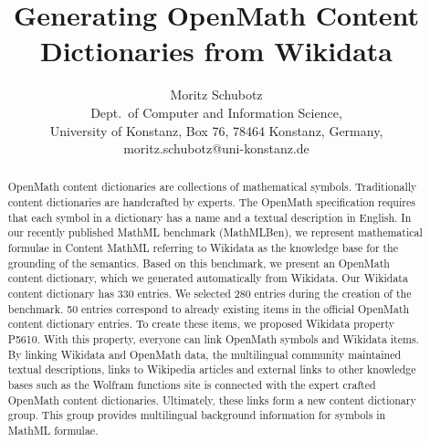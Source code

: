 \documentclass[a4paper]{article}
\title{Generating OpenMath Content Dictionaries from Wikidata}
\author{Moritz Schubotz \\
 Dept.~of Computer and Information Science,\\
 University of Konstanz, Box 76, 78464 Konstanz, Germany,\\
 moritz.schubotz@uni-konstanz.de
}
\begin{document}
\maketitle

\begin{abstract}
OpenMath content dictionaries are collections of mathematical symbols.
Traditionally content dictionaries are handcrafted by experts.
The OpenMath specification requires that each symbol in a dictionary has a name and a textual description in English.
In our recently published MathML benchmark (MathMLBen), we represent mathematical formulae in Content MathML referring to Wikidata as the knowledge base for the grounding of the semantics.
Based on this benchmark, we present an OpenMath content dictionary, which we generated automatically from Wikidata.
Our Wikidata content dictionary has 330 entries.
We selected 280 entries during the creation of the benchmark.
50 entries correspond to already existing items in the official OpenMath content dictionary entries.
To create these items, we proposed Wikidata property P5610.
With this property, everyone can link OpenMath symbols and Wikidata items.
By linking Wikidata and OpenMath data, the multilingual community maintained textual descriptions, links to Wikipedia articles and external links to other knowledge bases such as the Wolfram functions site is connected with the expert crafted OpenMath content dictionaries.
Ultimately, these links form a new content dictionary group.
This group provides multilingual background information for symbols in MathML formulae.
\end{abstract}
\end{document}
